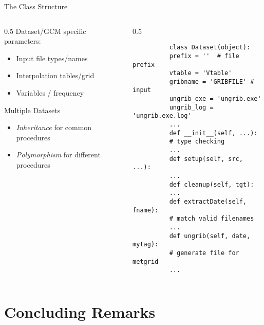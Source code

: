 \documentclass[hyperref={pdfpagelabels=false},compress,final]{beamer}
\newenvironment{myBox}[3][shadow=true]%
{\begin{center} \begin{minipage}{#2} \begin{beamerboxesrounded}[#1]{#3} \smallskip}%
{\smallskip \end{beamerboxesrounded} \end{minipage} \end{center}}
\begin{document}
\begin{frame}[fragile=singleslide]{The Class Structure}
  \begin{columns}
    \begin{column}{0.5\textwidth}
      Dataset/GCM specific parameters: \smallskip
      \begin{itemize}
        \item Input file types/names\smallskip
        \item Interpolation tables/grid \smallskip
        \item Variables / frequency \smallskip
      \end{itemize}
        \begin{myBox}{0.9\textwidth}{Multiple Datasets}
          \begin{itemize}
            \item \textit{\color{purple} Inheritance} for common procedures \smallskip
            \item \textit{\color{teal} Polymorphism} for different procedures
          \end{itemize}
        \end{myBox}
    \end{column}
    \begin{column}{0.5\textwidth}
      \vspace*{-1.25cm}
      \begin{myBox}{1.0\textwidth}{}
        \footnotesize
        \begin{verbatim}
          class Dataset(object):
          prefix = ''  # file prefix
          vtable = 'Vtable'
          gribname = 'GRIBFILE' # input
          ungrib_exe = 'ungrib.exe'
          ungrib_log = 'ungrib.exe.log'
          ...
          def __init__(self, ...):
          # type checking
          ...
          def setup(self, src, ...):
          ...
          def cleanup(self, tgt):
          ...
          def extractDate(self, fname):
          # match valid filenames
          ...
          def ungrib(self, date, mytag):
          # generate file for metgrid
          ...
        \end{verbatim}
      \end{myBox}
    \end{column}
  \end{columns}
\end{frame}

\section[Conclusion]{Concluding Remarks}
\end{document}
